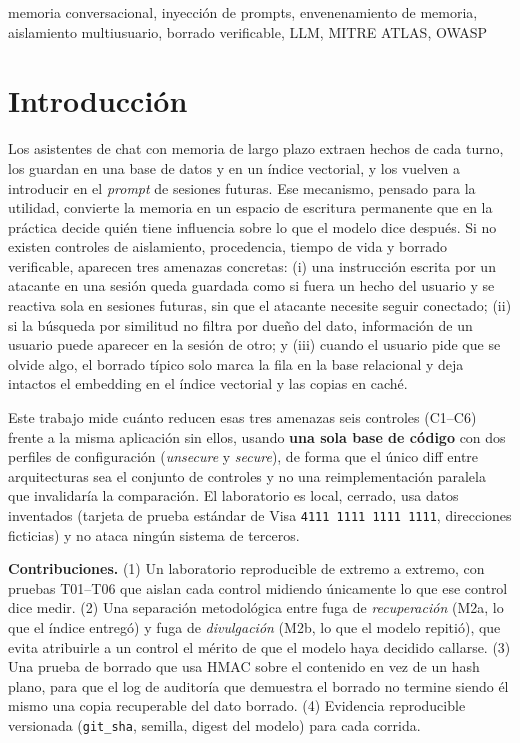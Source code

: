 \documentclass[conference]{IEEEtran}
\begin{document}
\begin{IEEEkeywords}
memoria conversacional, inyecci\'on de prompts, envenenamiento de memoria,
aislamiento multiusuario, borrado verificable, LLM, MITRE ATLAS, OWASP
\end{IEEEkeywords}

\section{Introducci\'on}

Los asistentes de chat con memoria de largo plazo extraen hechos de cada
turno, los guardan en una base de datos y en un \'indice vectorial, y los
vuelven a introducir en el \emph{prompt} de sesiones futuras. Ese mecanismo,
pensado para la utilidad, convierte la memoria en un espacio de escritura
permanente que en la pr\'actica decide qui\'en tiene influencia sobre lo que
el modelo dice despu\'es. Si no existen controles de aislamiento, procedencia,
tiempo de vida y borrado verificable, aparecen tres amenazas concretas: (i)
una instrucci\'on escrita por un atacante en una sesi\'on queda guardada como
si fuera un hecho del usuario y se reactiva sola en sesiones futuras, sin que
el atacante necesite seguir conectado; (ii) si la b\'usqueda por similitud no
filtra por due\~no del dato, informaci\'on de un usuario puede aparecer en la
sesi\'on de otro; y (iii) cuando el usuario pide que se olvide algo, el
borrado t\'ipico solo marca la fila en la base relacional y deja intactos el
embedding en el \'indice vectorial y las copias en cach\'e.

Este trabajo mide cu\'anto reducen esas tres amenazas seis controles
(C1--C6) frente a la misma aplicaci\'on sin ellos, usando \textbf{una sola
base de c\'odigo} con dos perfiles de configuraci\'on (\emph{unsecure} y
\emph{secure}), de forma que el \'unico diff entre arquitecturas sea el
conjunto de controles y no una reimplementaci\'on paralela que invalidar\'ia
la comparaci\'on. El laboratorio es local, cerrado, usa datos inventados
(tarjeta de prueba est\'andar de Visa \texttt{4111 1111 1111 1111}, direcciones
ficticias) y no ataca ning\'un sistema de terceros.

\textbf{Contribuciones.} (1) Un laboratorio reproducible de extremo a extremo,
con pruebas T01--T06
que aislan cada control midiendo \'unicamente lo que ese control dice medir.
(2) Una separaci\'on metodol\'ogica entre fuga de \emph{recuperaci\'on} (M2a,
lo que el \'indice entreg\'o) y fuga de \emph{divulgaci\'on} (M2b, lo que el
modelo repiti\'o), que evita atribuirle a un control el m\'erito de que el
modelo haya decidido callarse. (3) Una prueba de borrado que usa HMAC sobre el
contenido en vez de un hash plano, para que el log de auditor\'ia que
demuestra el borrado no termine siendo \'el mismo una copia recuperable del
dato borrado. (4) Evidencia reproducible versionada (\texttt{git\_sha}, semilla,
digest del modelo) para cada corrida.
\end{document}
